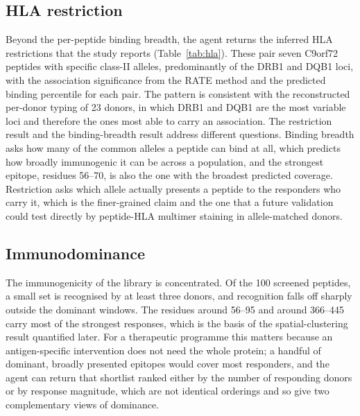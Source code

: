 \documentclass[11pt]{article}
\begin{document}
\subsection{HLA restriction}
Beyond the per-peptide binding breadth, the agent returns the inferred HLA restrictions that the
study reports (Table~\ref{tab:hla}). These pair seven C9orf72 peptides with specific class-II
alleles, predominantly of the DRB1 and DQB1 loci, with the association significance from the RATE
method and the predicted binding percentile for each pair. The pattern is consistent with the
reconstructed per-donor typing of 23 donors, in which DRB1 and DQB1 are the most variable loci and
therefore the ones most able to carry an association. The restriction result and the binding-breadth
result address different questions. Binding breadth asks how many of the common alleles a peptide can
bind at all, which predicts how broadly immunogenic it can be across a population, and the strongest
epitope, residues 56--70, is also the one with the broadest predicted coverage. Restriction asks
which allele actually presents a peptide to the responders who carry it, which is the finer-grained
claim and the one that a future validation could test directly by peptide-HLA multimer staining in
allele-matched donors.

\subsection{Immunodominance}
The immunogenicity of the library is concentrated. Of the 100 screened peptides, a small set is
recognised by at least three donors, and recognition falls off sharply outside the dominant windows.
The residues around 56--95 and around 366--445 carry most of the strongest responses, which is the
basis of the spatial-clustering result quantified later. For a therapeutic programme this matters
because an antigen-specific intervention does not need the whole protein; a handful of dominant,
broadly presented epitopes would cover most responders, and the agent can return that shortlist
ranked either by the number of responding donors or by response magnitude, which are not identical
orderings and so give two complementary views of dominance.
\end{document}
